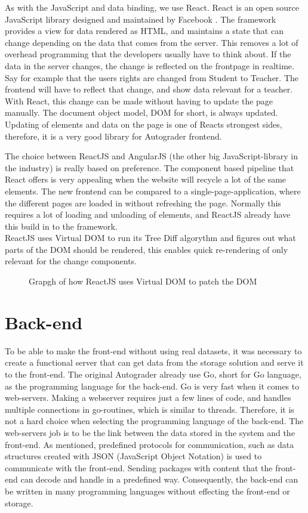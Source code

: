 As with the JavaScript and data binding, we use React. React is an open source JavaScript library designed and maintained by Facebook . The framework provides a view for data rendered as HTML, and maintains a state that can change depending on the data that comes from the server. This removes a lot of overhead programming that the developers usually have to think about. If the data in the server changes, the change is reflected on the frontpage in realtime. Say for example that the users rights are changed from Student to Teacher. The frontend will have to reflect that change, and show data relevant for a teacher. With React, this change can be made without having to update the page manually. The document object model, DOM for short, is always updated. Updating of elements and data on the page is one of Reacts strongest sides, therefore, it is a very good library for Autograder frontend.

The choice between ReactJS and AngularJS (the other big JavaScript-library in the industry) is really based on preference. The component based pipeline that React offers is very appealing when the website will recycle a lot of the same elements. The new frontend can be compared to a single-page-application, where the different pages are loaded in without refreshing the page. Normally this requires a lot of loading and unloading of elements, and ReactJS already have this build in to the framework.
\\ReactJS uses Virtual DOM to run its Tree Diff algorythm and figures out what parts of the DOM should be rendered, this enables quick re-rendering of only relevant for the change components.
\begin{figure}[h]
\centering
\scalebox{0.7}{}
\caption{Grapgh of how ReactJS uses Virtual DOM to patch the DOM}
\end{figure}
\newpage
\section{Back-end}
To be able to make the front-end without using real datasets, it was necessary to create a functional server that can get data from the storage solution and serve it to the front-end. The original Autograder already use Go, short for Go language, as the programming language for the back-end. Go is very fast when it comes to web-servers. Making a webserver requires just a few lines of code, and handles multiple connections in go-routines, which is similar to threads. Therefore, it is not a hard choice when selecting the programming language of the back-end. The web-servers job is to be the link between the data stored in the system and the front-end. As mentioned, predefined protocols for communication, such as data structures created with JSON (JavaScript Object Notation) is used to communicate with the front-end. Sending packages with content that the front-end can decode and handle in a predefined way. Consequently, the back-end can be written in many programming languages without effecting the front-end or storage.

